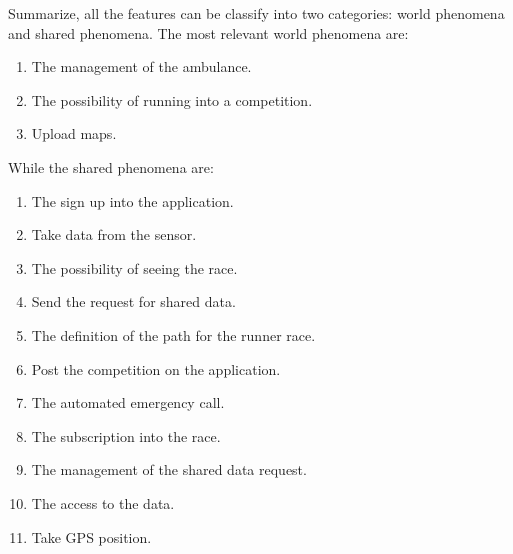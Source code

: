 Summarize, all the features can be classify into two categories: world phenomena and shared phenomena. 
The most relevant world phenomena are:
\begin{enumerate}
\item The management of the ambulance.
\item The possibility of running into a competition.
\item Upload maps. 
\end{enumerate}
While the shared phenomena are:
\begin{enumerate}
\item The sign up into the application.
\item Take data from the sensor.
\item The possibility of seeing the race.
\item Send the request for shared data.
\item The definition of the path for the runner race.
\item Post the competition on the application.
\item The automated emergency call. 
\item The subscription into the race. 
\item The management of the shared data request.
\item The access to the data.
\item Take GPS position.
\end{enumerate}
